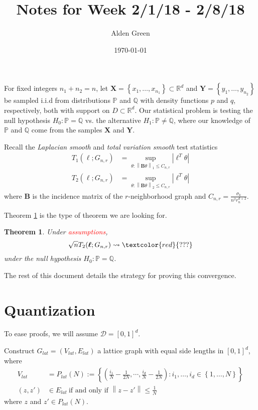 \documentclass{article}
\newcommand{\Reals}{\mathbb{R}}
\newcommand{\norm}[1]{\left\lVert#1\right\rVert}
\newcommand{\abs}[1]{\left \lvert #1 \right \rvert}
\newcommand{\set}[1]{\left\{#1\right\}}
\newcommand{\Rd}{\Reals^d}
\newcommand{\Xbf}{\mathbf{X}}
\newcommand{\Ybf}{\mathbf{Y}}
\newcommand{\Bbf}{\mathbf{B}}
\newcommand{\lbf}{\bm{\ell}}
\newcommand{\Dset}{\mathcal{D}}
\newcommand{\Pbb}{\mathbb{P}}
\newcommand{\Qbb}{\mathbb{Q}}
\newcommand{\1}{\mathbf{1}}
\theoremstyle{alden}
\theoremstyle{aldenthm}
\newtheorem{theorem}{Theorem}
\theoremstyle{remark}
\begin{document}
	
\title{Notes for Week 2/1/18 - 2/8/18}
\author{Alden Green}
\date{\today}
\maketitle

For fixed integers $n_1 + n_2 = n$, let $\Xbf = \set{x_1, \ldots, x_{n_1}} \subset \Rd$ and $\Ybf = \set{y_1, \ldots, y_{n_2}}$ be sampled i.i.d from distributions $\Pbb$ and $\Qbb$ with density functions $p$ and $q$, respectively, both with support on $D \subset \Rd$. Our statistical problem is testing the null hypothesis $H_0: \Pbb = \Qbb$ vs. the alternative $H_1: \Pbb \neq \Qbb$, where our knowledge of $\Pbb$ and $\Qbb$ come from the samples $\Xbf$ and $\Ybf$. 

Recall the \emph{Laplacian smooth} and \emph{total variation smooth} test statistics
\begin{align*}
T_1(\lbf; G_{n,r}) & = \sup_{\theta: \norm{\Bbf \theta}_1 \leq C_{n,r}}\abs{\lbf^T \theta} \\
T_2(\lbf; G_{n,r}) & = \sup_{\theta: \norm{\Bbf \theta}_2 \leq C_{n,r}}\abs{\lbf^T \theta}
\end{align*}
where $\Bbf$ is the incidence matrix of the $r$-neighborhood graph and $C_{n,r} = \frac{\sigma_k}{n^2 r_n^{d+2}}$. 

Theorem \ref{thm: weak_convergence_null_hypothesis_T2} is the type of theorem we are looking for.

\begin{theorem}
	\label{thm: weak_convergence_null_hypothesis_T2}
	Under \textcolor{red}{assumptions}, 
	\begin{equation*}
	\sqrt{n} T_2(\lbf; G_{n,r}) \rightsquigarrow \textcolor{red}{???}
	\end{equation*}
	under the null hypothesis $H_0: \Pbb = \Qbb$.
\end{theorem}

The rest of this document details the strategy for proving this convergence.

\section{Quantization}

To ease proofs, we will assume $\Dset = [0,1]^d$. 

Construct $G_{lat} = (V_{lat}, E_{lat})$ a lattice graph with equal side lengths in $[0,1]^d$, where
\begin{align*}
V_{lat} & = P_{lat}(N) := \set{\left(\frac{i_1}{N} - \frac{1}{2N}, \cdots, \frac{i_d}{N} - \frac{1}{2N}\right): i_1, \ldots, i_d \in \set{1, \ldots, N}} \\
(z,z') & \in E_{lat}~ \text{if and only if $\norm{z - z'} \leq \frac{1}{N}$}
\end{align*}
where $z$ and $z' \in P_{lat}(N)$.
\end{document}
